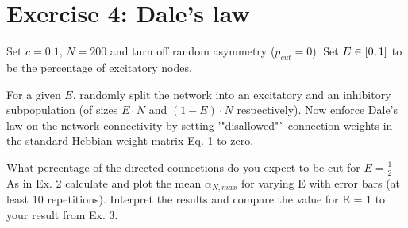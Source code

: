 \section{Exercise 4: Dale's law}

\begin{itshape}
\small
Set $c=0.1$, $N = 200$ and turn off random asymmetry ($p_{cut} = 0$). Set $E \in \left[0, 1\right]$ to be the percentage of excitatory nodes.

For a given $E$, randomly split the network into an excitatory and an inhibitory subpopulation (of sizes $E \cdot N$ and $(1 - E) \cdot N$ respectively). Now enforce Dale's law on the network connectivity by setting '"disallowed"` connection weights in the standard Hebbian weight matrix Eq. 1 to zero.

What percentage of the directed connections do you expect to be cut for $E = \frac{1}{2}$
As in Ex. 2 calculate and plot the mean $\alpha_{N,max}$ for varying E with error bars (at least 10 repetitions). Interpret the results and compare the value for E = 1 to your result from Ex. 3.
\end{itshape}



